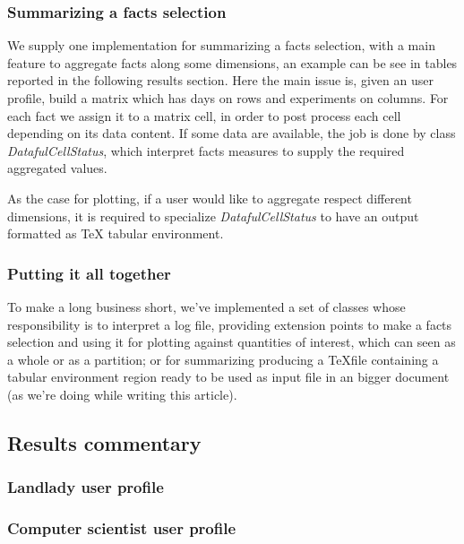 \documentclass[10pt,a4paper]{article}
\begin{document}
    \subsubsection{Summarizing a facts selection}

    We supply one implementation for summarizing a facts selection,
    with a main feature to aggregate facts along some dimensions, an
    example can be see in tables reported in the following results
    section. Here the main issue is, given an user profile, build a
    matrix which has days on rows and experiments on columns. For each
    fact we assign it to a matrix cell, in order to post process each
    cell depending on its data content. If some data are available,
    the job is done by class \emph{DatafulCellStatus}, which interpret
    facts measures to supply the required aggregated values.

    As the case for plotting, if a user would like to aggregate
    respect different dimensions, it is required to specialize
    \emph{DatafulCellStatus} to have an output formatted as \TeX
    tabular environment.

    \subsubsection{Putting it all together}
    
    To make a long business short, we've implemented a set of classes
    whose responsibility is to interpret a log file, providing
    extension points to make a facts selection and using it for
    plotting against quantities of interest, which can seen as a whole
    or as a partition; or for summarizing producing a \TeX file
    containing a tabular environment region ready to be used as input
    file in an bigger document (as we're doing while writing this
    article).
    
    \newpage

    \subsection{Results commentary}

    \subsubsection{Landlady user profile}
    

    \subsubsection{Computer scientist user profile}
\end{document}
